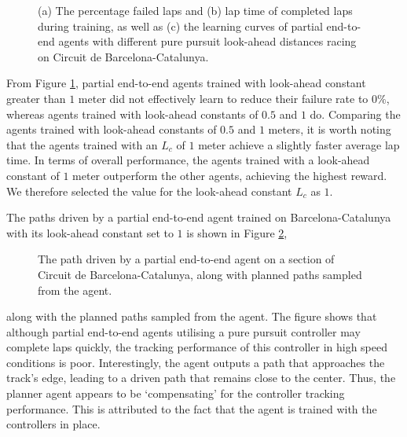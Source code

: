 \begin{figure}[htb!]
    \centering
    
    \caption[Learning curves for tuning the steering controller look-ahead constant of a partial end-to-end agent]{(a) The percentage failed laps and (b) lap time of completed laps during training, as well as (c) the learning curves of partial end-to-end agents with different pure pursuit look-ahead distances racing on Circuit de Barcelona-Catalunya.}
    \label{fig:lfc_curves}
\end{figure}

From Figure \ref{fig:lfc_curves}, partial end-to-end agents trained with look-ahead constant greater than $1$ meter did not effectively learn to reduce their failure rate to $0\%$, whereas agents trained with  look-ahead constants of $0.5$ and $1$ do.
Comparing the agents trained with look-ahead constants of $0.5$ and $1$ meters, it is worth noting that the agents trained with an $L_c$ of $1$ meter achieve a slightly faster average lap time. 
In terms of overall performance, the agents trained with a look-ahead constant of $1$ meter outperform the other agents, achieving the highest reward.
We therefore selected the value for the look-ahead constant $L_c$ as $1$.


The paths driven by a partial end-to-end agent trained on Barcelona-Catalunya with its look-ahead constant set to $1$ is shown in Figure \ref{fig:lfc_paths}, 
\begin{figure}[htb!]
    \centering
    
    \caption[The path driven by a partial end-to-end agent on a section of Circuit de Barcelona-Catalunya]{The path driven by a partial end-to-end agent on a section of Circuit de Barcelona-Catalunya, along with planned paths sampled from the agent.}
    \label{fig:lfc_paths}
\end{figure}
along with the planned paths sampled from the agent.
The figure shows that although partial end-to-end agents utilising a pure pursuit controller may complete laps quickly, the tracking performance of this controller in high speed conditions is poor.
Interestingly, the agent outputs a path that approaches the track's edge, leading to a driven path that remains close to the center.
Thus, the planner agent appears to be `compensating' for the controller tracking performance.
This is attributed to the fact that the agent is trained with the controllers in place.



